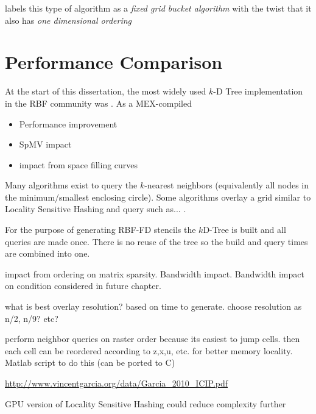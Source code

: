 \documentclass{report}
\begin{document}
\cite{Samet2005} labels this type of algorithm as a \emph{fixed grid bucket algorithm} with the twist that it also has \emph{one dimensional ordering}





\section{Performance Comparison}


At the start of this dissertation, the most widely used $k$-D Tree implementation in the RBF community was \cite{TagliasacchiMFE}. As a MEX-compiled 



\begin{itemize}
\item Performance improvement
\item SpMV impact
\item impact from space filling curves
\end{itemize}





Many algorithms exist to query the $k$-nearest neighbors (equivalently all nodes in the minimum/smallest enclosing circle). Some algorithms overlay a grid similar to Locality Sensitive Hashing and query such as... \cite{HarPeledMazumdar2003}.


For the purpose of generating RBF-FD stencils the $k$D-Tree is built and all queries are made once. There is no reuse of the tree so the build and query times are combined into one. 

impact from ordering on matrix sparsity. Bandwidth impact. Bandwidth impact on condition considered in future chapter. 

what is best overlay resolution? based on time to generate. choose resolution as n/2, n/9? etc? 

perform neighbor queries on raster order because its easiest to jump cells. then each cell can be reordered according to z,x,u, etc. for better memory locality. Matlab script to do this (can be ported to C)

\url{http://www.vincentgarcia.org/data/Garcia_2010_ICIP.pdf}

GPU version of Locality Sensitive Hashing could reduce complexity further \cite{Pan2011}
\end{document}

